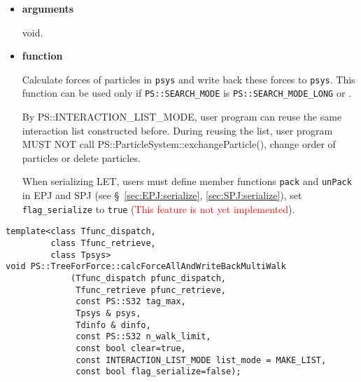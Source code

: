 \begin{itemize}
\item {\bf arguments}

void.

\item {\bf function}

Calculate forces of particles in {\tt psys} and write back these forces to {\tt psys}. This function can be used only if {\tt PS::SEARCH\_MODE} is {\tt PS::SEARCH\_MODE\_LONG} or .

By PS::INTERACTION\_LIST\_MODE, user program can reuse the same interaction list constructed before. During reusing the list, user program MUST NOT call \newline  PS::ParticleSystem::exchangeParticle(), change order of particles or delete particles.

When serializing LET, users must define member functions \texttt{pack} and \texttt{unPack} in EPJ and SPJ (see \S~\ref{sec:EPJ:serialize}, \ref{sec:SPJ:serialize}), set \texttt{flag\_serialize} to \texttt{true} (\textcolor{red}{This feature is not yet implemented}).

\end{itemize}

\label{sec:module_standard_treeforforce_calcforceallandwritebackmultiwalk}

\begin{screen}
\begin{verbatim}
template<class Tfunc_dispatch,
         class Tfunc_retrieve,
         class Tpsys>
void PS::TreeForForce::calcForceAllAndWriteBackMultiWalk
             (Tfunc_dispatch pfunc_dispatch,
              Tfunc_retrieve pfunc_retrieve,
              const PS::S32 tag_max,
              Tpsys & psys,
              Tdinfo & dinfo,
              const PS::S32 n_walk_limit,
              const bool clear=true,
              const INTERACTION_LIST_MODE list_mode = MAKE_LIST,
              const bool flag_serialize=false);
\end{verbatim}
\end{screen}

